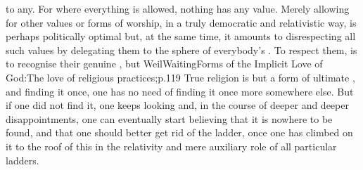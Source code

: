 to any. For where everything is allowed, nothing has any value.  Merely allowing
for other values or forms of worship, in a truly democratic and relativistic
way, is perhaps politically optimal but, at the same time, it amounts to
disrespecting all such values by delegating them to the sphere of everybody's
.  To respect them, is to recognise their genuine
, but \citet{we must have [first] given all our attention, all
  our faith, all our love to a particular religion in order to [be able to]
  think of any other religion with the high degree of attention, faith, and love
  that is proper to it.}{WeilWaiting}{Forms of the Implicit Love of God:The love
  of religious practices;p.119} True religion is but a form of ultimate
, and finding it once, one has no need of finding it once more
somewhere else. But if one did not find it, one keeps looking and, in the course
of deeper and deeper disappointments, one can eventually start believing that it
is nowhere to be found, and that one should better get rid of the ladder, once
one has climbed on it to the roof of this  in the relativity and
mere auxiliary role of all particular ladders.


